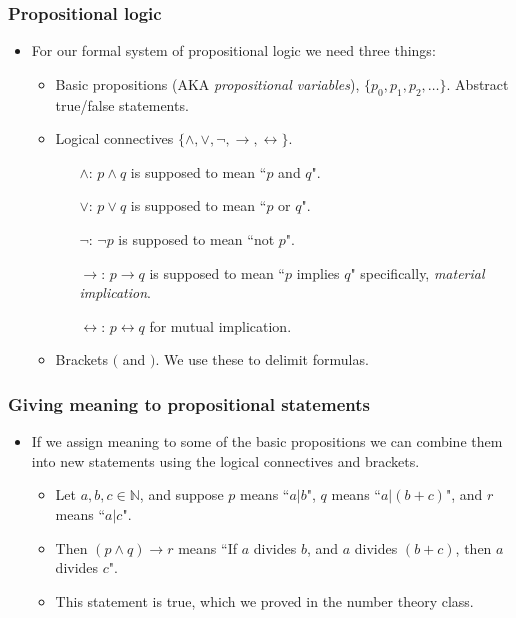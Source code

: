 \documentclass[handout]{beamer}
\newcommand{\bN}{\mathbb{N}}
\begin{document}
\begin{frame}
\frametitle{Propositional logic}
\begin{itemize}
\item For our formal system of propositional logic we need three things:
\vspace{0.2cm}
\begin{itemize}
\item Basic propositions (AKA \emph{propositional variables}),  $\{p_0,p_1,p_2,\ldots\}$. Abstract true/false statements.
\vspace{0.2cm}
\item Logical connectives $\{\wedge,\vee,\neg,\rightarrow,\leftrightarrow\}$.
\vspace{0.2cm}
\begin{itemize}
\item[$\wedge$:] $p\wedge q$ is supposed to mean ``$p$ and $q$". 
\vspace{0.2cm}
\item[$\vee$:] $p\vee q$ is supposed to mean ``$p$ or $q$".
\vspace{0.2cm}
\item[$\neg$:] $\neg p$ is supposed to mean ``not $p$".
\vspace{0.2cm}
\item[$\rightarrow$:] $p\rightarrow q$ is supposed to mean ``$p$ implies $q$" specifically, \emph{material implication}.
\vspace{0.2cm}
\item[$\leftrightarrow$:] $p\leftrightarrow q$ for mutual implication.
\end{itemize}
\vspace{0.2cm}
\item Brackets $($ and $)$. We use these to delimit formulas.
\end{itemize}
\end{itemize}
\end{frame}

\begin{frame}
\frametitle{Giving meaning to propositional statements}
\begin{itemize}
\item If we assign meaning to some of the basic propositions we can combine them into new statements using the logical connectives and brackets.
\vspace{0.2cm}
\begin{example}
\begin{itemize}
\item Let $a,b,c\in \bN$, and suppose  $p$ means ``$a|b$", $q$ means ``$a|(b+c)$", and $r$ means ``$a|c$". 
\vspace{0.2cm}
\item Then $(p\wedge q)\rightarrow r$ means ``If $a$ divides $b$, and $a$ divides $(b+c)$, then $a$ divides $c$". 
\vspace{0.2cm}
\item This statement is true, which we proved in the number theory class.
\end{itemize}
\end{example}
\end{itemize}
\end{frame}
\end{document}
